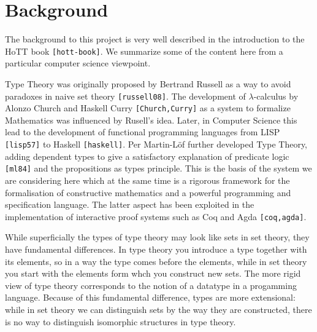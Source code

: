 \documentclass[twocolumn,a4paper,11pt]{article}
\renewcommand{\cite}[1]{{\tt[#1]}}
\begin{document}

\section{Background}

The background to this project is very well described in the
introduction to the HoTT book \cite{hott-book}. We summarize some of
the content here from a particular computer science viewpoint.

Type Theory was originally proposed by Bertrand Russell as a way to
avoid paradoxes in naive set theory \cite{russell08}. The development
of $\lambda$-calculus by Alonzo Church and Haskell Curry
\cite{Church,Curry} as a system to formalize
Mathematics was influenced by Rusell's idea. Later, in Computer Science this
lead to the development of functional programming languages from LISP
\cite{lisp57} to Haskell \cite{haskell}. Per Martin-L\"of further
developed Type Theory, adding dependent types to give a satisfactory
explanation of predicate logic \cite{ml84} and the propositions as
types principle. This is the basis of the system we are considering
here which at the same time is a rigorous framework for the
formalisation of constructive mathematics and a powerful programming
and specification language. The latter aspect has been exploited in
the implementation of interactive proof systems such as Coq and Agda
\cite{coq,agda}. 

While superficially the types of type theory may look like sets in
set theory, they have fundamental differences. In type theory you
introduce a type together with its elements, so in a way the type
comes before the elements, while in set theory you start with the
elements form whch you construct new sets. The more rigid view of
type theory corresponds to the notion of a datatype in a progamming
language. Because of this fundamental difference, types are more
extensional: while in set theory we can distinguish sets by the way
they are constructed, there is no way to distinguish isomorphic
structures in type theory.
\end{document}
